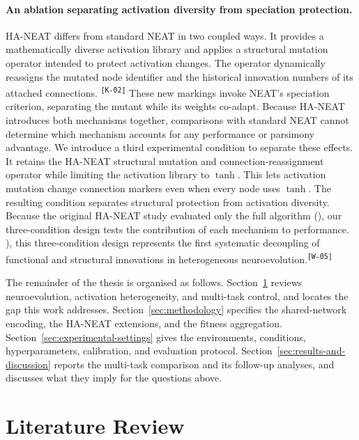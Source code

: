 \documentclass[12pt]{article}
\newcommand{\revID}[1]{\textsuperscript{\scriptsize\texttt{[#1]}}}
\newcommand{\revWrong}[2]{\textcolor{revRed}{#2}\revID{#1}}
\newcommand{\revConsistency}[2]{\textcolor{revBlue}{#2}\revID{#1}}
\begin{document}
\paragraph{An ablation separating activation diversity from speciation protection.}
HA-NEAT \parencite{hagg_evolving_2017} differs from standard NEAT \parencite{stanley_evolving_2002} in two coupled ways. 
It provides a mathematically diverse activation library and applies a structural mutation operator intended to protect activation changes. 
\revConsistency{K-02}{The operator dynamically reassigns the mutated node identifier and the historical innovation numbers of its attached connections. }
These new markings invoke NEAT's speciation criterion, separating the mutant while its weights co-adapt. 
Because HA-NEAT introduces both mechanisms together, comparisons with standard NEAT cannot determine which mechanism accounts for any performance or parsimony advantage.
We introduce a third experimental condition to separate these effects. 
It retains the HA-NEAT structural mutation and connection-reassignment operator while limiting the activation library to $\tanh$. 
This lets activation mutation change connection markers even when every node uses $\tanh$.
The resulting condition separates structural protection from activation diversity. 
Because the original HA-NEAT study evaluated only the full algorithm (\cite{hagg_evolving_2017}), our three-condition design tests the contribution of each mechanism to performance.
\revWrong{W-05}{\cite{hagg_evolving_2017}), this three-condition design represents the first systematic decoupling of functional and structural innovations in heterogeneous neuroevolution.}


The remainder of the thesis is organised as follows.
Section~\ref{sec:literature-review} reviews neuroevolution, activation heterogeneity, and multi-task control, and locates the gap this work addresses.
Section~\ref{sec:methodology} specifies the shared-network encoding, the HA-NEAT extensions, and the fitness aggregation.
Section~\ref{sec:experimental-settings} gives the environments, conditions, hyperparameters, calibration, and evaluation protocol.
Section~\ref{sec:results-and-discussion} reports the multi-task comparison and its follow-up analyses, and discusses what they imply for the questions above.

\newpage
\section{Literature Review}
\label{sec:literature-review}
\end{document}
